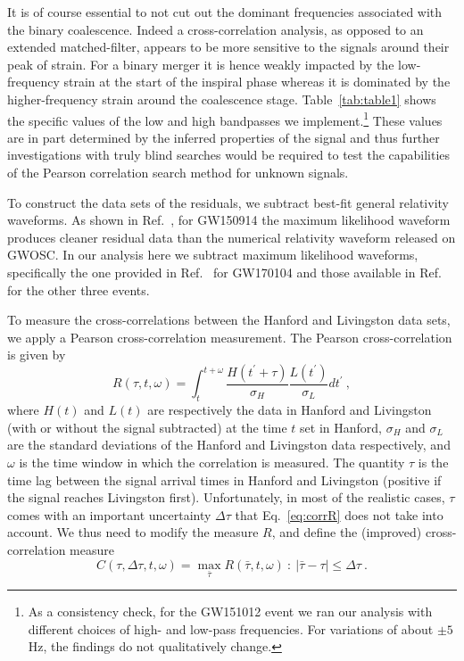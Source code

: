 \documentclass[a4paper,11pt]{article}
\begin{document}
It is of course essential to not cut out the dominant frequencies associated with the binary coalescence. Indeed a cross-correlation analysis, as opposed to an extended matched-filter, appears to be more sensitive to the signals around their peak of strain. For a binary merger it is hence weakly impacted by the low-frequency strain at the start of the inspiral phase whereas it is dominated by the higher-frequency strain around the coalescence stage. Table~\ref{tab:table1} shows the specific values of the low and high bandpasses we implement.\footnote{As a consistency check, for the GW151012 event we ran our analysis with different choices of high- and low-pass frequencies. For variations of about $\pm5$\,Hz, the findings do not qualitatively change.}
These values are in part determined by the inferred properties of the signal and thus further investigations with truly blind searches would be required to test the capabilities of the Pearson correlation search method for unknown signals.



To construct the data sets of the residuals, we subtract best-fit general relativity waveforms. As shown in Ref.~\cite{Nielsen:2018bhc}, for GW150914 the maximum likelihood waveform produces cleaner residual data than the numerical relativity waveform released on GWOSC. In our analysis here we subtract maximum likelihood waveforms, specifically the one provided in Ref.~\cite{De:2018zrk} for GW170104 and those available in Ref.~\cite{Biwer:2018osg} for the other three events.  
%


To measure the cross-correlations between the Hanford and Livingston data sets, we apply a Pearson cross-correlation measurement. The Pearson cross-correlation is given by
%
\begin{equation}
    R(\tau, t, \omega) = \int_{t}^{t+\omega}{\frac{H(t^{\prime} + \tau)}{\sigma_H} \frac{L(t^{\prime})}{\sigma_L}dt^{\prime}}~,
\label{eq:corrR}
\end{equation} 
%
where $H(t)$ and $L(t)$ are respectively the data in Hanford and Livingston (with or without the signal subtracted) at the time $t$ set in Hanford, ${\sigma_H}$ and ${\sigma_L}$ are the standard deviations of the Hanford and Livingston data respectively, and $\omega$ is the time window in which the correlation is measured. The quantity $\tau$ is the time lag between the signal arrival times in Hanford and Livingston (positive if the signal reaches Livingston first). Unfortunately, in most of the realistic cases,  $\tau$ comes with an important uncertainty $\Delta\tau$ that Eq.~\eqref{eq:corrR} does not take into account.  
We thus need to modify the measure $R$, and  define the (improved) cross-correlation measure
%
\begin{equation}
\label{eq:corrC}
    C(\tau, \Delta \tau, t, \omega) =  \max_{\bar \tau} R(\bar\tau,t,\omega) \: : \: |\bar \tau-\tau|\le \Delta \tau~.
\end{equation} 
%
\end{document}
